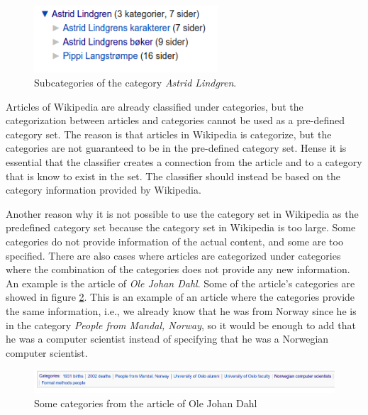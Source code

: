 \begin{figure}[H]
\centering
\includegraphics[height=2.5cm]{Dumps/imgs/Kategorier-Astrid-Lindgren.png}
\caption{Subcategories of the category \textit{Astrid Lindgren}. }
\label{fig: subcat_lindgren}
\end{figure}

Articles of Wikipedia are already classified under categories, but the categorization between articles and categories cannot be used as a pre-defined category set. The reason is that articles in Wikipedia is categorize, but the categories are not guaranteed to be in the pre-defined category set. Hense it is essential that the classifier creates a connection from the article and to a category that is know to exist in the set. The classifier should instead be based on the category information provided by Wikipedia. 

Another reason why it is not possible to use the category set in Wikipedia as the predefined category set because the category set in Wikipedia is too large. Some categories do not  provide information of the actual content, and some are too specified. There are also cases where articles are categorized under categories where the combination of the categories does not provide any new information. An example is the article of \textit{Ole Johan Dahl}. Some of the article's categories are showed in figure \ref{fig: olejohandahl_categories}. This is an example of an article where the categories provide the same information, i.e., we already know that he was from Norway since he is in the category \textit{People from Mandal, Norway}, so it would be enough to add that he was a computer scientist instead of specifying that he was a Norwegian computer scientist. 

\begin{figure}[H]
\centering
\includegraphics[width=\textwidth]{Dumps/imgs/olejohandahl-categories.png}
\caption{Some categories from the article of Ole Johan Dahl}
\label{fig: olejohandahl_categories}
\end{figure}

